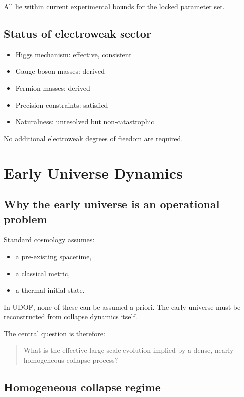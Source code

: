 \documentclass[11pt]{book}
\begin{document}
All lie within current experimental bounds for the locked parameter set.

\section{Status of electroweak sector}

\begin{itemize}
\item Higgs mechanism: effective, consistent
\item Gauge boson masses: derived
\item Fermion masses: derived
\item Precision constraints: satisfied
\item Naturalness: unresolved but non-catastrophic
\end{itemize}

No additional electroweak degrees of freedom are required.

\chapter{Early Universe Dynamics}

\section{Why the early universe is an operational problem}

Standard cosmology assumes:
\begin{itemize}
\item a pre-existing spacetime,
\item a classical metric,
\item a thermal initial state.
\end{itemize}

In UDOF, none of these can be assumed a priori.
The early universe must be reconstructed from collapse dynamics itself.

The central question is therefore:

\begin{quote}
What is the effective large-scale evolution implied by a dense,
nearly homogeneous collapse process?
\end{quote}

\section{Homogeneous collapse regime}
\end{document}
